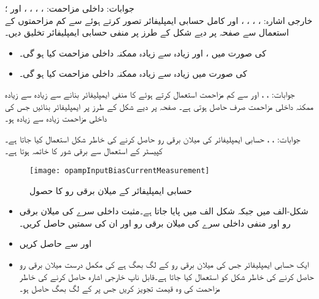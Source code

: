 جوابات:
داخلی مزاحمت: ، ، ، ،  اور ؛\\
خارجی اشارہ: ، ، ، ،  اور 
 
کامل حسابی ایمپلیفائر تصور کرتے ہوئے  سے کم مزاحمتوں کے استعمال سے  صفحہ  پر دیے شکل  کے طرز پر منفی حسابی ایمپلیفائر تخلیق دیں۔ 
\begin{itemize}
\item
  کی صورت میں ،  اور زیادہ سے زیادہ ممکنہ داخلی مزاحمت کیا ہو گی۔ 
\item
{} کی صورت میں زیادہ سے زیادہ ممکنہ داخلی مزاحمت کیا ہو گی۔ 
\end{itemize}

جوابات: ، ،  اور  
 سے کم مزاحمت استعمال کرتے ہوئے   کا منفی ایمپلیفائر بنانے سے زیادہ سے زیادہ ممکنہ داخلی مزاحمت صرف  حاصل ہوتی ہے۔ صفحہ  پر دیے شکل  کے طرز پر ایمپلیفائر بنائیں جس کی داخلی مزاحمت زیادہ سے زیادہ ہو۔

جوابات: ، ،  
حسابی ایمپلیفائر کی میلان برقی رو حاصل کرنے کی خاطر شکل  استعمال کیا جاتا ہے۔کپیسٹر کے استعمال سے برقی شور کا خاتمہ ہوتا ہے۔
\begin{figure}
\centering
\texttt{[image: opampInputBiasCurrentMeasurement]}
\caption{حسابی ایمپلیفائر کے میلان برقی رو کا حصول}
\label{شکل__سوال_حسابی_میلان_برقی_رو}
\end{figure}
\begin{itemize}
\item
شکل-الف میں  جبکہ شکل  الف     میں   پایا جاتا ہے۔مثبت داخلی سرے  کی میلان برقی رو  اور منفی داخلی سرے  کی میلان برقی رو   اور ان کی سمتیں حاصل کریں۔
\item
{} اور  سے  حاصل کریں
\item
ایک حسابی ایمپلیفائر جس کی میلان برقی رو  کے لگ بھگ ہے کی مکمل درست میلان برقی رو حاصل کرنے کی خاطر شکل کو استعمال کیا جاتا ہے۔قابل ناپ خارجی اشارہ حاصل کرنے کی خاطر مزاحمت کی وہ قیمت تجویز کریں جس پر  کے لگ بھگ حاصل ہو۔
\end{itemize}

